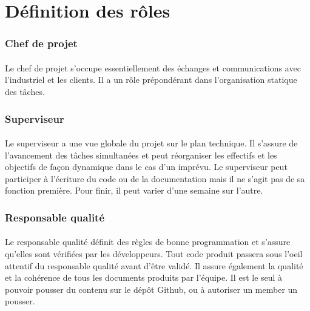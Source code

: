 \documentclass{report}
\begin{document}
\section{D\'{e}finition des r\^{o}les}

\subsubsection{Chef de projet}

\paragraph{}
\hspace{4mm}\textnormal{Le chef de projet s'occupe essentiellement des \'{e}changes et communications avec l'industriel et les clients. 
Il a un r\^{o}le pr\'{e}pond\'{e}rant dans l'organisation statique des t\^{a}ches.}

\subsubsection{Superviseur}

\paragraph{}
\hspace{4mm}\textnormal{Le superviseur a une vue globale du projet sur le plan technique. Il s'assure de l'avancement des t\^{a}ches simultan\'{e}es
et peut r\'{e}organiser les effectifs et les objectifs de fa\c{c}on dynamique dans le cas d'un impr\'{e}vu.
Le superviseur peut participer \`{a} l'\'{e}criture du code ou de la documentation mais il ne s'agit
pas de sa fonction premi\`{e}re. Pour finir, il peut varier d'une semaine sur l'autre.}

\subsubsection{Responsable qualit\'{e}}

\paragraph{}
\hspace{4mm}\textnormal{Le responsable qualit\'{e} d\'{e}finit des r\`{e}gles de bonne programmation et s'assure qu'elles sont v\'{e}rifi\'{e}es par les d\'{e}veloppeurs.
Tout code produit passera sous l'oeil attentif du responsable qualit\'{e} avant d'\^{e}tre valid\'{e}. Il assure \'{e}galement
la qualit\'{e} et la coh\'{e}rence de tous les documents produits par l'\'{e}quipe. Il est le seul \`{a} pouvoir pousser
du contenu sur le d\'{e}p\^{o}t Github, ou \`{a} autoriser un member un pousser.}
\end{document}
